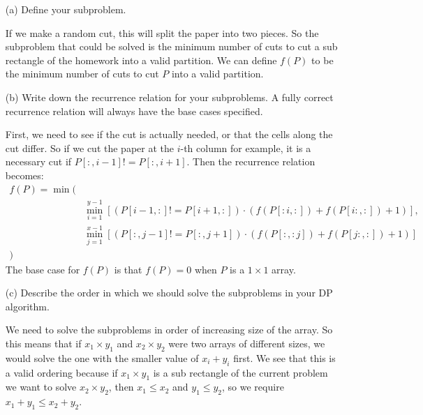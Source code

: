 \documentclass{article}
\begin{document}
    \begin{itemize}
        \item [(a)] Define your subproblem.
            \begin{answer}
                If we make a random cut, this will split the paper into two pieces. So the subproblem that could be solved is the minimum number of cuts to cut a sub rectangle of the homework into a valid partition. We can define $f(P)$ to be the minimum number of cuts to cut $P$ into a valid partition.
            \end{answer}

        \item [(b)] Write down the recurrence relation for your subproblems. A fully correct recurrence relation will always have the base cases specified.
            \begin{answer}
                First, we need to see if the cut is actually needed, or that the cells along the cut differ. So if we cut the paper at the $i$-th column for example, it is a necessary cut if $P[:, i-1] != P[:, i+1]$. Then the recurrence relation becomes:
                    \begin{align*}
                        f(P) = \min(& \\
                        &\min_{i=1}^{y-1}[(P[i-1, :] != P[i+1, :]) \cdot (f(P[:i, :]) + f(P[i:, :]) + 1)], \\
                        &\min_{j=1}^{x-1}[(P[:, j-1] != P[:, j+1]) \cdot (f(P[:, :j]) + f(P[j:, :]) + 1)] \\
                        )
                    \end{align*}
                The base case for $f(P)$ is that $f(P) = 0$ when $P$ is a $1 \times 1$ array.
            \end{answer}

        \item [(c)] Describe the order in which we should solve the subproblems in your DP algorithm.
            \begin{answer}
                We need to solve the subproblems in order of increasing size of the array. So this means that if $x_{1} \times y_{1}$ and $x_{2} \times y_{2}$ were two arrays of different sizes, we would solve the one with the smaller value of $x_{i} + y_{i}$ first. We see that this is a valid ordering because if $x_{1} \times y_{1}$ is a sub rectangle of the current problem we want to solve $x_{2} \times y_{2}$, then $x_{1} \leq x_{2}$ and $y_{1} \leq y_{2}$, so we require $x_{1} + y_{1} \leq x_{2} + y_{2}$.
            \end{answer}


\end{itemize}
\end{document}
